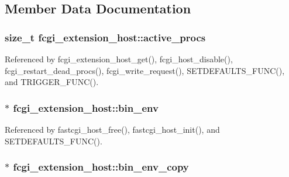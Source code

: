\subsection{Member Data Documentation}
\hypertarget{structfcgi__extension__host_af3fda20375871a51758c52b477b0153b}{
\subsubsection[{active\-\_\-procs}]{\setlength{\rightskip}{0pt plus 5cm}size\-\_\-t fcgi\-\_\-extension\-\_\-host\-::active\-\_\-procs}}\label{structfcgi__extension__host_af3fda20375871a51758c52b477b0153b}


Referenced by fcgi\-\_\-extension\-\_\-host\-\_\-get(), fcgi\-\_\-host\-\_\-disable(), fcgi\-\_\-restart\-\_\-dead\-\_\-procs(), fcgi\-\_\-write\-\_\-request(), S\-E\-T\-D\-E\-F\-A\-U\-L\-T\-S\-\_\-\-F\-U\-N\-C(), and T\-R\-I\-G\-G\-E\-R\-\_\-\-F\-U\-N\-C().

\hypertarget{structfcgi__extension__host_a3e08a47d9440a7629058c1ab1507f774}{
\subsubsection[{bin\-\_\-env}]{$\ast$ fcgi\-\_\-extension\-\_\-host\-::bin\-\_\-env}}\label{structfcgi__extension__host_a3e08a47d9440a7629058c1ab1507f774}


Referenced by fastcgi\-\_\-host\-\_\-free(), fastcgi\-\_\-host\-\_\-init(), and S\-E\-T\-D\-E\-F\-A\-U\-L\-T\-S\-\_\-\-F\-U\-N\-C().

\hypertarget{structfcgi__extension__host_a78a69c7361dd17fe6be7a45498629e2b}{
\subsubsection[{bin\-\_\-env\-\_\-copy}]{$\ast$ fcgi\-\_\-extension\-\_\-host\-::bin\-\_\-env\-\_\-copy}}\label{structfcgi__extension__host_a78a69c7361dd17fe6be7a45498629e2b}


